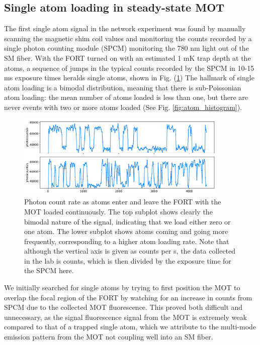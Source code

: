 
\subsection{Single atom loading in steady-state MOT}

The first single atom signal in the network experiment was found by manually scanning the magnetic shim coil values and monitoring the counts recorded by a single photon counting module (SPCM) monitoring the 780 nm light out of the SM fiber. With the FORT turned on with an estimated 1 mK trap depth at the atoms, a sequence of jumps in the typical counts recorded by the SPCM in 10-15 ms exposure times heralds single atoms, shown in Fig. (\ref{fig:atoms_loaded_steady_state}) The hallmark of single atom loading is a bimodal distribution, meaning that there is sub-Poissonian atom loading: the mean number of atoms loaded is less than one, but there are never events with two or more atoms loaded (See Fig. \ref{fig:atom_histogram}).
\begin{figure}[!ht]
    \centering
    \includegraphics[width=0.9\textwidth]{Images/2024-06-21_atom_loading_with_continuous_MOT_time_series_loading_comparison_aspect0.02.pdf}
    \caption{Photon count rate as atoms enter and leave the FORT with the MOT loaded continuously. The top subplot shows clearly the bimodal nature of the signal, indicating that we load either zero or one atom. The lower subplot shows atoms coming and going more frequently, corresponding to a higher atom loading rate. Note that although the vertical axis is given
    as counts per s, the data collected in the lab is counts, 
    which is then divided by the exposure time for the SPCM here.}
    \label{fig:atoms_loaded_steady_state}
\end{figure}
We initially searched for single atoms by trying to first position the MOT to overlap the focal region of the FORT by watching for an increase in counts from SPCM due to the collected MOT fluorescence. This proved both difficult and unnecessary, as the signal fluorescence signal from the MOT is extremely weak compared to that of a trapped single atom, which we attribute to the multi-mode emission pattern from the MOT not coupling well into an SM fiber. 

